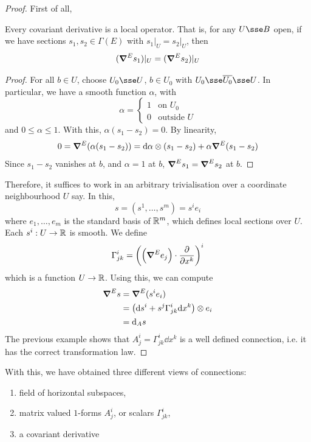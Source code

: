 \documentclass{article}
\begin{document}
\begin{proof}
    First of all,
    \begin{claim}
        Every covariant derivative is a local operator. That is, for any \(U \sse B\) open, if we have sections \(s_1, s_2 \in \Gamma(E)\) with \(s_1\vert_U = s_2\vert_U\), then
        \[(\grad^Es_1)\vert_U = (\grad^Es_2)\vert_U\]
    \end{claim}

    \begin{proof}
        For all \(b \in U\), choose \(U_0 \sse U\), \(b \in U_0\) with \(U_0 \sse \overline{U_0} \sse U\). In particular, we have a smooth function \(\alpha\), with
        \[\alpha = \begin{cases}
            1 & \text{on }U_0 \\
            0 & \text{outside }U
        \end{cases}\]
        and \(0 \le \alpha \le 1\). With this, \(\alpha(s_1 - s_2) = 0\). By linearity,
        \[0 = \grad^E(\alpha(s_1 - s_2)) = \dd \alpha \otimes (s_1 - s_2) + \alpha \grad^E(s_1 - s_2)\]
        Since \(s_1 - s_2\) vanishes at \(b\), and \(\alpha = 1\) at \(b\), \(\grad^E s_1 = \grad^E s_2\) at \(b\).
    \end{proof}

    Therefore, it suffices to work in an arbitrary trivialisation over a coordinate neighbourhood \(U\) say. In this,
    \[s = (s^1, \dots, s^m) = s^i e_i\]
    where \(e_1, \dots, e_m\) is the standard basis of \(\mathbb{R}^m\), which defines local sections over \(U\). Each \(s^i : U \to \mathbb{R}\) is smooth. We define
    \[\Gamma^i_{jk} = \left(\left(\grad^E e_j\right) \cdot \pdv{x^k}\right)^i\]
    which is a function \(U \to \mathbb{R}\). Using this, we can compute
    \begin{align*}
        \grad^E s &= \grad^E(s^i e_i) \\
        &= \left(\dd s^i + s^j\Gamma^i_{jk}\dd x^k\right) \otimes e_i \\
        &= \dd_A s
    \end{align*}
    The previous example shows that \(A^i_j = \Gamma^i_{jk}\dd x^k\) is a well defined connection, i.e. it has the correct transformation law.
\end{proof}

With this, we have obtained three different views of connections:

\begin{enumerate}
    \item field of horizontal subspaces,
    \item matrix valued \(1\)-forms \(A^i_j\), or scalars \(\Gamma^i_{jk}\),
    \item a covariant derivative
\end{enumerate}
\end{document}
